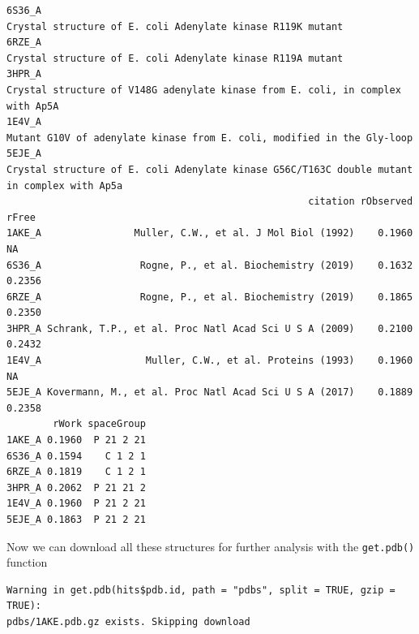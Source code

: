 \documentclass[
  letterpaper,
  DIV=11,
  numbers=noendperiod]{scrartcl}
\newenvironment{Shaded}{\begin{snugshade}}{\end{snugshade}}
\newcommand{\AttributeTok}[1]{\textcolor[rgb]{0.40,0.45,0.13}{#1}}
\newcommand{\CommentTok}[1]{\textcolor[rgb]{0.37,0.37,0.37}{#1}}
\newcommand{\ConstantTok}[1]{\textcolor[rgb]{0.56,0.35,0.01}{#1}}
\newcommand{\FunctionTok}[1]{\textcolor[rgb]{0.28,0.35,0.67}{#1}}
\newcommand{\NormalTok}[1]{\textcolor[rgb]{0.00,0.23,0.31}{#1}}
\newcommand{\OtherTok}[1]{\textcolor[rgb]{0.00,0.23,0.31}{#1}}
\newcommand{\SpecialCharTok}[1]{\textcolor[rgb]{0.37,0.37,0.37}{#1}}
\newcommand{\StringTok}[1]{\textcolor[rgb]{0.13,0.47,0.30}{#1}}
\begin{document}
\begin{verbatim}
6S36_A                                                                                                                   Crystal structure of E. coli Adenylate kinase R119K mutant
6RZE_A                                                                                                                   Crystal structure of E. coli Adenylate kinase R119A mutant
3HPR_A                                                                                               Crystal structure of V148G adenylate kinase from E. coli, in complex with Ap5A
1E4V_A                                                                                                       Mutant G10V of adenylate kinase from E. coli, modified in the Gly-loop
5EJE_A                                                                                  Crystal structure of E. coli Adenylate kinase G56C/T163C double mutant in complex with Ap5a
                                                    citation rObserved  rFree
1AKE_A                Muller, C.W., et al. J Mol Biol (1992)    0.1960     NA
6S36_A                 Rogne, P., et al. Biochemistry (2019)    0.1632 0.2356
6RZE_A                 Rogne, P., et al. Biochemistry (2019)    0.1865 0.2350
3HPR_A Schrank, T.P., et al. Proc Natl Acad Sci U S A (2009)    0.2100 0.2432
1E4V_A                  Muller, C.W., et al. Proteins (1993)    0.1960     NA
5EJE_A Kovermann, M., et al. Proc Natl Acad Sci U S A (2017)    0.1889 0.2358
        rWork spaceGroup
1AKE_A 0.1960  P 21 2 21
6S36_A 0.1594    C 1 2 1
6RZE_A 0.1819    C 1 2 1
3HPR_A 0.2062  P 21 21 2
1E4V_A 0.1960  P 21 2 21
5EJE_A 0.1863  P 21 2 21
\end{verbatim}

Now we can download all these structures for further analysis with the
\texttt{get.pdb()} function

\begin{Shaded}
\end{Shaded}

\begin{verbatim}
Warning in get.pdb(hits$pdb.id, path = "pdbs", split = TRUE, gzip = TRUE):
pdbs/1AKE.pdb.gz exists. Skipping download
\end{verbatim}
\end{document}
